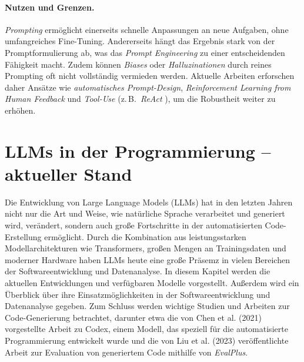\documentclass[11pt,a4paper]{article}
\begin{document}
\paragraph{Nutzen und Grenzen.}
\emph{Prompting} ermöglicht einerseits schnelle Anpassungen an neue Aufgaben, ohne umfangreiches Fine-Tuning. Andererseits hängt das Ergebnis stark von der Promptformulierung ab, was das \emph{Prompt Engineering} zu einer entscheidenden Fähigkeit macht. Zudem können \emph{Biases} oder \emph{Halluzinationen} durch reines Prompting oft nicht vollständig vermieden werden. Aktuelle Arbeiten erforschen daher Ansätze wie \emph{automatisches Prompt-Design}, \emph{Reinforcement Learning from Human Feedback} und \emph{Tool-Use} (z.\,B.\ \emph{ReAct} \cite{yao2022react}), um die Robustheit weiter zu erhöhen.


\section{LLMs in der Programmierung – aktueller Stand}
\label{sec:llms_programmierung}
Die Entwicklung von Large Language Models (LLMs) hat in den letzten Jahren nicht nur die Art und Weise, wie natürliche Sprache verarbeitet und generiert wird, verändert, sondern auch große Fortschritte in der automatisierten Code-Erstellung ermöglicht. Durch die Kombination aus leistungsstarken Modellarchitekturen wie Transformers, großen Mengen an Trainingsdaten und moderner Hardware haben LLMs heute eine große Präsemz in vielen Bereichen der Softwareentwicklung und Datenanalyse.
In diesem Kapitel werden die aktuellen Entwicklungen und verfügbaren Modelle vorgestellt. Außerdem wird ein Überblick über ihre Einsatzmöglichkeiten in der Softwareentwicklung und Datenanalyse gegeben. Zum Schluss werden wichtige Studien und Arbeiten zur Code-Generierung betrachtet, darunter etwa die von Chen et al. (2021) vorgestellte Arbeit zu Codex, einem Modell, das speziell für die automatisierte Programmierung entwickelt wurde\cite{chen2021evaluatinglargelanguagemodels} und die von Liu et al. (2023) veröffentlichte Arbeit zur Evaluation von generiertem Code mithilfe von \emph{EvalPlus}\cite{NEURIPS2023_43e9d647}.
\end{document}
